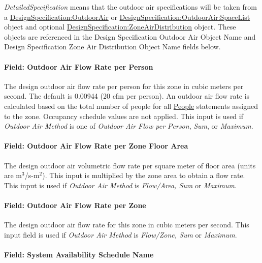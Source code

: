 \emph{DetailedSpecification} means that the outdoor air specifications will be taken from a \hyperref[designspecificationoutdoorair]{DesignSpecification:OutdoorAir} or \hyperref[designspecificationoutdoorairspacelist]{DesignSpecification:OutdoorAir:SpaceList} object and optional \hyperref[designspecificationzoneairdistribution]{DesignSpecification:ZoneAirDistribution} object. These objects are referenced in the Design Specification Outdoor Air Object Name and Design Specification Zone Air Distribution Object Name fields below.

\paragraph{Field: Outdoor Air Flow Rate per Person}\label{field-outdoor-air-flow-rate-per-person-4}

The design outdoor air flow rate per person for this zone in cubic meters per second. The default is 0.00944 (20 cfm per person). An outdoor air flow rate is calculated based on the total number of people for all \hyperref[people]{People} statements assigned to the zone. Occupancy schedule values are not applied. This input is used if \emph{Outdoor Air Method} is one of \emph{Outdoor Air Flow per Person}, \emph{Sum}, or \emph{Maximum}.

\paragraph{Field: Outdoor Air Flow Rate per Zone Floor Area}\label{field-outdoor-air-flow-rate-per-zone-floor-area-4}

The design outdoor air volumetric flow rate per square meter of floor area (units are m\(^{3}\)/s-m\(^{2}\)). This input is multiplied by the zone area to obtain a flow rate. This input is used if \emph{Outdoor Air Method} is \emph{Flow/Area, Sum} or \emph{Maximum}.

\paragraph{Field: Outdoor Air Flow Rate per Zone}\label{field-outdoor-air-flow-rate-per-zone-4}

The design outdoor air flow rate for this zone in cubic meters per second. This input field is used if \emph{Outdoor Air Method} is \emph{Flow/Zone, Sum} or \emph{Maximum}.

\paragraph{Field: System Availability Schedule Name}\label{field-system-availability-schedule-name-3}


